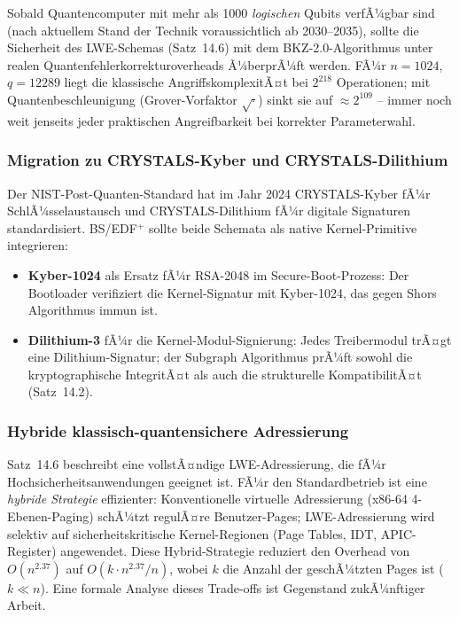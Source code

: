 ﻿\documentclass[a4paper,12pt]{scrreprt}
\theoremstyle{definition}
\begin{document}
	Sobald Quantencomputer mit mehr als 1000 \emph{logischen} Qubits verfÃ¼gbar
	sind (nach aktuellem Stand der Technik voraussichtlich ab 2030--2035),
	sollte die Sicherheit des LWE-Schemas (Satz~14.6) mit dem BKZ-2.0-Algorithmus
	\cite{Chen2011} unter realen Quantenfehlerkorrekturoverheads Ã¼berprÃ¼ft werden.
	FÃ¼r $n = 1024$, $q = 12289$ liegt die klassische AngriffskomplexitÃ¤t bei
	$2^{218}$ Operationen; mit Quantenbeschleunigung (Grover-Vorfaktor
	$\sqrt{\cdot}$) sinkt sie auf $\approx 2^{109}$ -- immer noch weit jenseits
	jeder praktischen Angreifbarkeit bei korrekter Parameterwahl.
	
	\subsubsection{Migration zu CRYSTALS-Kyber und CRYSTALS-Dilithium}
	
	Der NIST-Post-Quanten-Standard hat im Jahr 2024 CRYSTALS-Kyber \cite{Bos2018}
	fÃ¼r SchlÃ¼sselaustausch und CRYSTALS-Dilithium \cite{Ducas2018} fÃ¼r
	digitale Signaturen standardisiert. BS/EDF$^+$ sollte beide Schemata
	als native Kernel-Primitive integrieren:
	
	\begin{itemize}
		\item \textbf{Kyber-1024} als Ersatz fÃ¼r RSA-2048 im Secure-Boot-Prozess:
		Der Bootloader verifiziert die Kernel-Signatur mit Kyber-1024,
		das gegen Shors Algorithmus \cite{Shor1994} immun ist.
		\item \textbf{Dilithium-3} fÃ¼r die Kernel-Modul-Signierung:
		Jedes Treibermodul trÃ¤gt eine Dili\-thium-Signatur; der Subgraph
		Algorithmus prÃ¼ft sowohl die kryptographische IntegritÃ¤t als auch
		die strukturelle KompatibilitÃ¤t (Satz~14.2).
	\end{itemize}
	
	\subsubsection{Hybride klassisch-quantensichere Adressierung}
	
	Satz~14.6 beschreibt eine vollstÃ¤ndige LWE-Adressierung, die fÃ¼r
	Hochsicherheitsanwendungen geeignet ist. FÃ¼r den Standardbetrieb
	ist eine \emph{hybride Strategie} effizienter: Konventionelle
	virtuelle Adressierung (x86-64 4-Ebenen-Paging) schÃ¼tzt regulÃ¤re
	Benutzer-Pages; LWE-Adressierung wird selektiv auf
	sicherheitskritische Kernel-Regionen (Page Tables, IDT, APIC-Register)
	angewendet. Diese Hybrid-Strategie reduziert den Overhead von
	$O(n^{2.37})$ auf $O(k \cdot n^{2.37}/n)$, wobei $k$ die Anzahl
	der geschÃ¼tzten Pages ist ($k \ll n$). Eine formale
	Analyse dieses Trade-offs ist Gegenstand zukÃ¼nftiger Arbeit.
	
\end{document}
